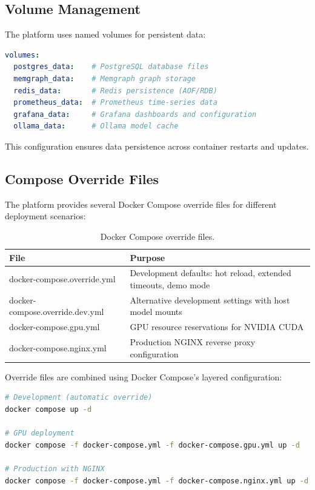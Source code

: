 \subsection{Volume Management}

The platform uses named volumes for persistent data:

\begin{lstlisting}[language=yaml, caption=Volume definitions]
volumes:
  postgres_data:    # PostgreSQL database files
  memgraph_data:    # Memgraph graph storage
  redis_data:       # Redis persistence (AOF/RDB)
  prometheus_data:  # Prometheus time-series data
  grafana_data:     # Grafana dashboards and configuration
  ollama_data:      # Ollama model cache
\end{lstlisting}

This configuration ensures data persistence across container restarts and updates.

\subsection{Compose Override Files}

The platform provides several Docker Compose override files for different deployment scenarios:

\begin{table}[ht]
\centering
\caption{Docker Compose override files.}
\label{tab:compose-overrides}
\begin{tabular}{lp{9cm}}
\hline
\textbf{File} & \textbf{Purpose} \\
\hline
docker-compose.override.yml & Development defaults: hot reload, extended timeouts, demo mode \\
docker-compose.override.dev.yml & Alternative development settings with host model mounts \\
docker-compose.gpu.yml & GPU resource reservations for NVIDIA CUDA \\
docker-compose.nginx.yml & Production NGINX reverse proxy configuration \\
\hline
\end{tabular}
\end{table}

Override files are combined using Docker Compose's layered configuration:

\begin{lstlisting}[language=bash, caption=Using compose override files]
# Development (automatic override)
docker compose up -d

# GPU deployment
docker compose -f docker-compose.yml -f docker-compose.gpu.yml up -d

# Production with NGINX
docker compose -f docker-compose.yml -f docker-compose.nginx.yml up -d
\end{lstlisting}

